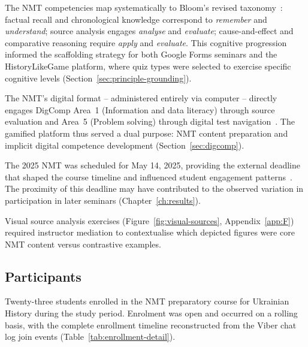 The NMT competencies map systematically to Bloom's revised taxonomy~\cite{Clark2016}: factual recall and chronological knowledge correspond to \emph{remember} and \emph{understand}; source analysis engages \emph{analyse} and \emph{evaluate}; cause-and-effect and comparative reasoning require \emph{apply} and \emph{evaluate}. This cognitive progression informed the scaffolding strategy for both Google Forms seminars and the HistoryLikeGame platform, where quiz types were selected to exercise specific cognitive levels (Section~\ref{sec:principle-grounding}).

The NMT's digital format -- administered entirely via computer -- directly engages DigComp Area~1 (Information and data literacy) through source evaluation and Area~5 (Problem solving) through digital test navigation~\cite{Vuorikari2016, Cosgrove2025}. The gamified platform thus served a dual purpose: NMT content preparation and implicit digital competence development (Section~\ref{sec:digcomp}).

The 2025 NMT was scheduled for May 14, 2025, providing the external deadline that shaped the course timeline and influenced student engagement patterns~\cite{Vuorikari2016}. The proximity of this deadline may have contributed to the observed variation in participation in later seminars (Chapter~\ref{ch:results}).

Visual source analysis exercises (Figure~\ref{fig:visual-sources}, Appendix~\ref{app:F}) required instructor mediation to contextualise which depicted figures were core NMT content versus contrastive examples.


\subsection{Participants}

Twenty-three students enrolled in the NMT preparatory course for Ukrainian History during the study period. Enrolment was open and occurred on a rolling basis, with the complete enrollment timeline reconstructed from the Viber chat log join events (Table~\ref{tab:enrollment-detail}).

